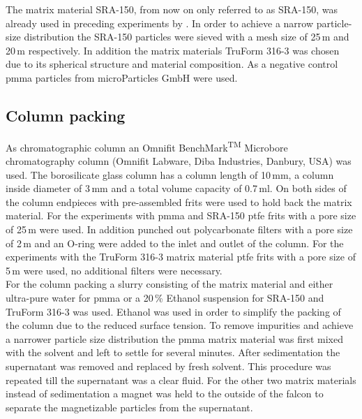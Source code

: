 The matrix material SRA-150, from now on only referred to as SRA-150, was already used in preceding experiments by \cite{AndreMaster}. In order to achieve a narrow particle-size distribution the SRA-150 particles were sieved with a mesh size of 25\,\textmu m and 20\,\textmu m respectively. In addition the matrix materials TruForm 316-3 was chosen due to its spherical structure and material composition. 
As a negative control \gls{pmma} particles from microParticles GmbH were used.  

\subsection{Column packing}
\label{subsec:col_pack}
As chromatographic column an Omnifit\textsuperscript{\textregistered} BenchMark\textsuperscript{TM} Microbore chromatography column (Omnifit Labware, Diba Industries, Danbury, USA) was used. The borosilicate glass column has a column length of 10\,mm, a column inside diameter of 3\,mm and a total volume capacity of 0.7\,ml. On both sides of the column endpieces with pre-assembled frits were used to hold back the matrix material. For the experiments with \gls{pmma} and SRA-150 \gls{ptfe} frits with a pore size of 25\,\textmu m were used. In addition punched out polycarbonate filters with a pore size of 2\,\textmu m and an O-ring were added to the inlet and outlet of the column. For the experiments with the TruForm 316-3 matrix material \gls{ptfe} frits with a pore size of 5\,\textmu m were used, no additional filters were necessary. \\   
For the column packing a slurry consisting of the matrix material and either ultra-pure water for \gls{pmma} or a 20\,\% Ethanol suspension for SRA-150 and TruForm 316-3 was used. Ethanol was used in order to simplify the packing of the column due to the reduced surface tension. To remove impurities and achieve a narrower particle size distribution the \gls{pmma} matrix material was first mixed with the solvent and left to settle for several minutes. After sedimentation the supernatant was removed and replaced by fresh solvent. This procedure was repeated till the supernatant was a clear fluid. For the other two matrix materials instead of sedimentation a magnet was held to the outside of the falcon to separate the magnetizable particles from the supernatant.\\   
